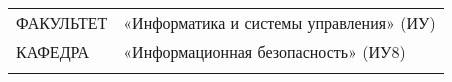 {    \par\vspace{-1.41\ht\strutbox}\noindent\hrulefill\par
    \par\vspace{-1.41\ht\strutbox}\noindent\hrulefill\par
    \par\vspace{-1.35\ht\strutbox}\noindent\hrulefill\par
    \par\vspace{-1.41\ht\strutbox}\noindent\hrulefill\par

    \vspace{-.2cm}

    \begin{flushleft}
        \fontsize{12}{12}\selectfont

        \noindent
        \begin{tabular}{ll}
            ФАКУЛЬТЕТ    & «Информатика и системы управления» (ИУ) \\[6pt]
            КАФЕДРА      & «Информационная безопасность» (ИУ8)     \\
            \hspace{3cm} &
        \end{tabular}
    \end{flushleft}
}

